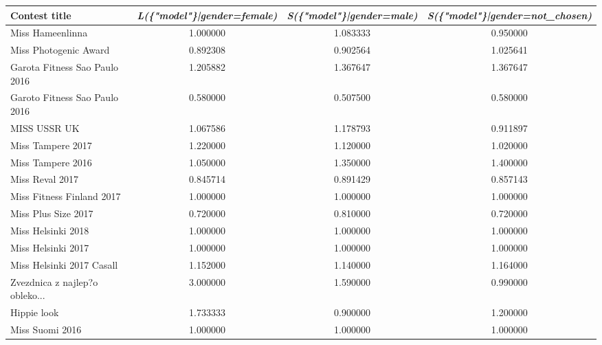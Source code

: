 \documentclass[english]{tktltiki}
\begin{document}
\begin{table}[H]
    \centering
    \begin{adjustbox}{width=1\textwidth}
    \begin{tabular}{lccc}
        \toprule
        \textbf{Contest title} & \textbf{\emph{L(\{"model"\}|gender=female)}} & \textbf{\emph{S(\{"model"\}|gender=male)}} & \textbf{\emph{S(\{"model"\}|gender=not\_chosen)}} \\
        \midrule
                                  Miss Hameenlinna &  1.000000 &  1.083333 &    0.950000 \\
                             Miss Photogenic Award &  0.892308 &  0.902564 &    1.025641 \\
                     Garota Fitness Sao Paulo 2016 &  1.205882 &  1.367647 &    1.367647 \\
                     Garoto Fitness Sao Paulo 2016 &  0.580000 &  0.507500 &    0.580000 \\
                                      MISS USSR UK &  1.067586 &  1.178793 &    0.911897 \\
                                 Miss Tampere 2017 &  1.220000 &  1.120000 &    1.020000 \\
                                 Miss Tampere 2016 &  1.050000 &  1.350000 &    1.400000 \\
                                   Miss Reval 2017 &  0.845714 &  0.891429 &    0.857143 \\
                         Miss Fitness Finland 2017 &  1.000000 &  1.000000 &    1.000000 \\
                               Miss Plus Size 2017 &  0.720000 &  0.810000 &    0.720000 \\
                                Miss Helsinki 2018 &  1.000000 &  1.000000 &    1.000000 \\
                                Miss Helsinki 2017 &  1.000000 &  1.000000 &    1.000000 \\
                         Miss Helsinki 2017 Casall &  1.152000 &  1.140000 &    1.164000 \\
                Zvezdnica z najlep?o obleko... &  3.000000 &  1.590000 &    0.990000 \\
                                       Hippie look &  1.733333 &  0.900000 &    1.200000 \\
                                   Miss Suomi 2016 &  1.000000 &  1.000000 &    1.000000 \\

\end{tabular}
\end{adjustbox}
\end{table}
\end{document}
